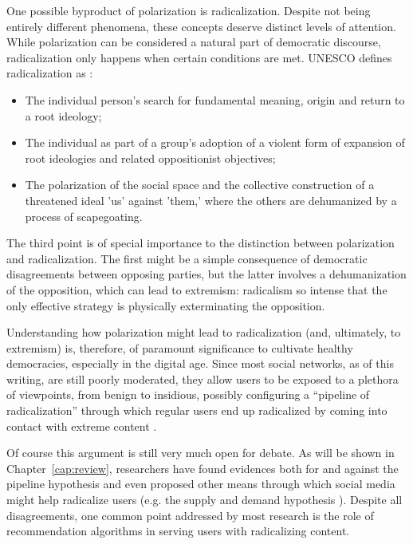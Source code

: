 One possible byproduct of polarization is radicalization. Despite not being
entirely different phenomena, these concepts deserve distinct levels of
attention. While polarization can be considered a natural part of democratic
discourse, radicalization only happens when certain conditions are met. UNESCO
defines radicalization as \citep{seraphin_youth_2017}:

\begin{itemize}
  \item The individual person's search for fundamental meaning, origin and
        return to a root ideology;
  \item The individual as part of a group's adoption of a violent form of
        expansion of root ideologies and related oppositionist objectives;
  \item The polarization of the social space and the collective construction of
        a threatened ideal 'us' against 'them,' where the others are dehumanized
        by a process of scapegoating.
\end{itemize}

The third point is of special importance to the distinction between polarization
and radicalization. The first might be a simple consequence of democratic
disagreements between opposing parties, but the latter involves a dehumanization
of the opposition, which can lead to extremism: radicalism so intense that the
only effective strategy is physically exterminating the opposition.

Understanding how polarization might lead to radicalization (and, ultimately, to
extremism) is, therefore, of paramount significance to cultivate healthy
democracies, especially in the digital age. Since most social networks, as of
this writing, are still poorly moderated, they allow users to be exposed to a
plethora of viewpoints, from benign to insidious, possibly configuring a
``pipeline of radicalization'' through which regular users end up radicalized by
coming into contact with extreme content \citep{ribeiro_auditing_2020}.

Of course this argument is still very much open for debate. As will be shown in
Chapter~\ref{cap:review}, researchers have found evidences both for and against
the pipeline hypothesis and even proposed other means through which social media
might help radicalize users (e.g. the supply and demand hypothesis
\citep{munger_right-wing_2020}). Despite all disagreements, one common point
addressed by most research is the role of recommendation algorithms in serving
users with radicalizing content.

